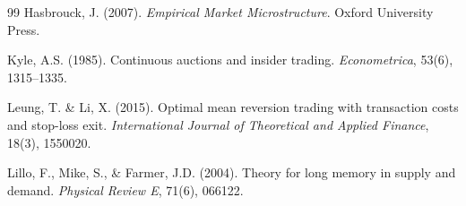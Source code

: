 \documentclass[11pt,a4paper]{article}
\begin{document}
\begin{thebibliography}{99}
Hasbrouck, J. (2007).
\emph{Empirical Market Microstructure}.
Oxford University Press.

Kyle, A.S. (1985).
Continuous auctions and insider trading.
\emph{Econometrica}, 53(6), 1315--1335.

Leung, T. \& Li, X. (2015).
Optimal mean reversion trading with transaction costs and
stop-loss exit.
\emph{International Journal of Theoretical and Applied Finance},
18(3), 1550020.

Lillo, F., Mike, S., \& Farmer, J.D. (2004).
Theory for long memory in supply and demand.
\emph{Physical Review E}, 71(6), 066122.

\end{thebibliography}
\end{document}

